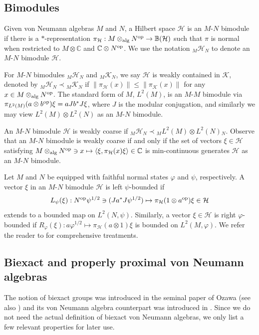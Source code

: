 \documentclass[a4paper,11pt]{amsart}
\theoremstyle{definition}
\newcommand{\B}{{\mathbb B}}
\newcommand{\C}{{\mathbb C}}
\newcommand{\cH}{{\mathcal H}}
\newcommand{\cK}{{\mathcal K}}
\newcommand{\ot}{\otimes}
\newcommand{\op}{{\rm op}}
\begin{document}
\subsection{Bimodules}
Given von Neumann algebras $M$ and $N$, a Hilbert space $\cH$ is an $M$-$N$ bimodule if there is a
	$*$-representation $\pi_\cH:M\ot_{\rm alg} N^\op\to \B(\cH)$ such that $\pi$ is normal when restricted to $M\ot \C$
	and $\C\ot N^\op$. 
We use the notation ${_M}\cH{_N}$ to denote an $M$-$N$ bimodule $\cH$.

For $M$-$N$ bimodules ${_M}\cH{_N}$ and ${_M}\cK{_N}$, we say $\cH$ is weakly contained in $\cK$, denoted by ${_M}\cH{_N}\prec {_M}\cK{_N}$
	if $\|\pi_\cH(x)\|\leq \|\pi_\cK(x)\|$ for any $x\in M\ot_{\rm alg} N^\op$.
The standard form of $M$, $L^2(M)$, is an $M$-$M$ bimodule via $\pi_{L^2(M)}(a\ot b^\op)\xi=a Jb^*J \xi$,
	where $J$ is the modular conjugation,
	and similarly we may view $L^2(M)\ot L^2(N)$ as an $M$-$N$ bimodule.
	
An $M$-$N$ bimodule $\cH$ is weakly coarse if ${_M}\cH{_N}\prec {_M} L^2(M)\ot L^2(N){_N}$.
Observe that an $M$-$N$ bimodule is weakly coarse if and only if
	the set of vectors	$\xi\in \cH$ satisfying $M\ot_{\rm alg} N^\op\ni x\mapsto \langle \xi, \pi_\cH(x)\xi\rangle\in \C$ is min-continuous
	generates $\cH$ as an $M$-$N$ bimodule.
	
Let $M$ and $N$ be equipped with faithful normal states $\varphi$ and $\psi$, respectively. 
A vector $\xi$ in an $M$-$N$ bimodule $\cH$ is left $\psi$-bounded if
$$
L_\psi(\xi): N^\op \psi^{1/2}\ni (Ja^*J \psi^{1/2})\mapsto \pi_{\cH}(1\ot a^\op)\xi\in \cH
$$
extends to a bounded map on $L^2(N,\psi)$.
Similarly, a vector $\xi\in\cH$ is right $\varphi$-bounded if
	$R_\varphi(\xi):a\varphi^{1/2} \mapsto \pi_\cH(a\ot 1)\xi$ is bounded on $L^2(M,\varphi)$.
We refer the reader to \cite{Po86, Take03} for comprehensive treatments.

\subsection{Biexact and properly proximal von Neumann algebras}\label{sec: biexact and pp}

The notion of biexact groups was introduced in the seminal paper of Ozawa \cite{Oza04} (see also \cite{BO08})
	and its von Neumann algebra counterpart was introduced in \cite{DP23}.
Since we do not need the actual definition of biexact von Neumann algebras, we only list a few relevant properties for later use.
\end{document}
